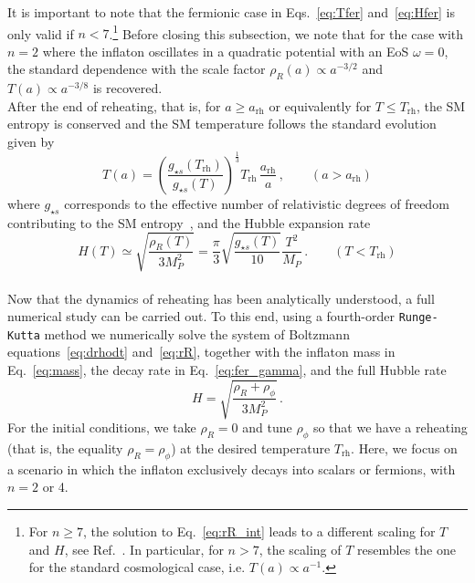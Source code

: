 \documentclass[a4paper,11pt]{article}
\newcommand{\rR}{\rho_R}
\newcommand{\rp}{\rho_\phi}
\newcommand{\gss}{g_{\star s}}
\newcommand{\arh}{a_\text{rh}}
\newcommand{\Trh}{T_\text{rh}}
\begin{document}
It is important to note that the fermionic case in Eqs.~\eqref{eq:Tfer} and~\eqref{eq:Hfer} is only valid if $n < 7$.\footnote{For $n\geq7$, the solution to Eq.~\eqref{eq:rR_int} leads to a different scaling for $T$ and $H$, see Ref.~\cite{Bernal:2022wck}. In particular, for $n>7$, the scaling of $T$ resembles the one for the standard cosmological case, i.e. $T(a) \propto a^{-1}$.}
Before closing this subsection, we note that for the case with $n = 2$ where the inflaton oscillates in a quadratic potential with an EoS $\omega = 0$, the standard dependence with the scale factor $\rR(a) \propto a^{-3/2}$ and $T(a) \propto a^{-3/8}$ is recovered.\\

After the end of reheating, that is, for $a \geq \arh$ or equivalently for $T \leq \Trh$, the SM entropy is conserved and the SM temperature follows the standard evolution given by
\begin{equation} \label{eq:TSM}
    T(a) = \left(\frac{\gss(\Trh)}{\gss(T)}\right)^\frac13 \Trh\, \frac{\arh}{a}\,,
    \qquad(a>\arh)
\end{equation}
where $\gss$ corresponds to the effective number of relativistic degrees of freedom contributing to the SM entropy~\cite{Drees:2015exa}, and the Hubble expansion rate
\begin{equation}
    H(T) \simeq \sqrt{\frac{\rR(T)}{3 M_P^2}} = \frac{\pi}{3} \sqrt{\frac{\gss(T)}{10}} \frac{T^2}{M_P}\,.
    \qquad(T<\Trh)
\end{equation}\\

Now that the dynamics of reheating has been analytically understood, a full numerical study can be carried out. To this end, using a fourth-order \texttt{Runge-Kutta} method we numerically solve the system of Boltzmann equations~\eqref{eq:drhodt} and~\eqref{eq:rR}, together with the inflaton mass  in Eq.~\eqref{eq:mass}, the decay rate in Eq.~\eqref{eq:fer_gamma}, and the full Hubble rate
\begin{equation} \label{eq:H}
    H = \sqrt{\frac{\rR + \rp}{3 M_P^2}}\,.
\end{equation}
For the initial conditions, we take $\rR = 0$ and tune $\rp$ so that we have a reheating (that is, the equality $\rR = \rp$) at the desired temperature $\Trh$.
Here, we focus on a scenario in which the inflaton exclusively decays into scalars or fermions, with $n = 2$ or 4. 
\end{document}
